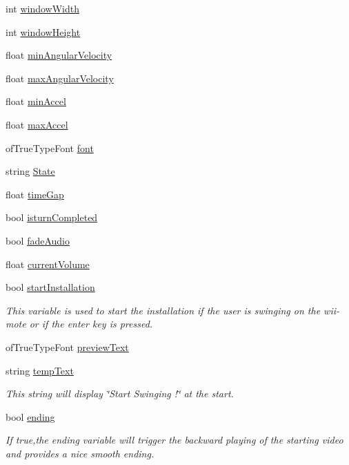 \begin{DoxyCompactItemize}
int \hyperlink{classtest_app_a9ed611377cd46f5148a3a3d538e96484}{window\-Width}
\item 
int \hyperlink{classtest_app_a4e8884eeef5b2657b62278969d4e3dcf}{window\-Height}
\item 
float \hyperlink{classtest_app_ac559756a01e0b98378bc29dfba9fac79}{min\-Angular\-Velocity}
\item 
float \hyperlink{classtest_app_ab9565e8e6dc748ef68e6845f5f94cae9}{max\-Angular\-Velocity}
\item 
float \hyperlink{classtest_app_ab007edbc20b09d607f8010e2dbafdb97}{min\-Accel}
\item 
float \hyperlink{classtest_app_a34e834a5e4d359700147a74eece8eed1}{max\-Accel}
\item 
of\-True\-Type\-Font \hyperlink{classtest_app_a0fdf83c29e178256ee0c1a5b9ee81653}{font}
\item 
string \hyperlink{classtest_app_a8ce5505df4526abed238956b65956edd}{State}
\item 
float \hyperlink{classtest_app_a944f2713019239a4b49241a5cc9a00c9}{time\-Gap}
\item 
bool \hyperlink{classtest_app_a42478a80a90ce9f663c04bcdaea5c5bd}{isturn\-Completed}
\item 
bool \hyperlink{classtest_app_a918c09b5a4389a8402cfacb25d390226}{fade\-Audio}
\item 
float \hyperlink{classtest_app_a51c20c5432d9f6b06f719526d9a34ee6}{current\-Volume}
\item 
bool \hyperlink{classtest_app_a8a65a6d1a473417cec1c2ac2e6116aae}{start\-Installation}
\begin{DoxyCompactList}\small\item\em This variable is used to start the installation if the user is swinging on the wii-\/mote or if the enter key is pressed. \end{DoxyCompactList}\item 
of\-True\-Type\-Font \hyperlink{classtest_app_af5b1af55af2256ef3751de075fc7a9cc}{preview\-Text}
\item 
string \hyperlink{classtest_app_ad9a4beab6f2e0f13d32b00b502e89bdc}{temp\-Text}
\begin{DoxyCompactList}\small\item\em This string will display \char`\"{}\-Start Swinging !\char`\"{} at the start. \end{DoxyCompactList}\item 
bool \hyperlink{classtest_app_acf09303bc452d2a38098f6bf94655408}{ending}
\begin{DoxyCompactList}\small\item\em If true,the ending variable will trigger the backward playing of the starting video and provides a nice smooth ending. \end{DoxyCompactList}\item 

\end{DoxyCompactItemize}
